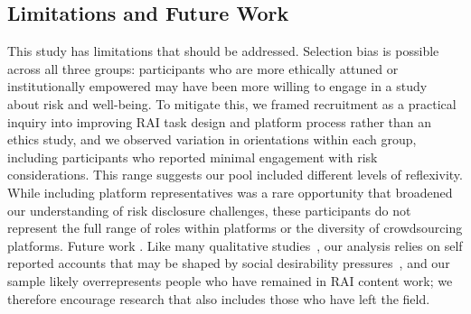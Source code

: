 \subsection{Limitations and Future Work}
This study has limitations that should be addressed. Selection bias is possible across all three groups: participants who are more ethically attuned or institutionally empowered may have been more willing to engage in a study about risk and well-being. To mitigate this, we framed recruitment as a practical inquiry into improving RAI task design and platform process rather than an ethics study, and we observed variation in orientations within each group, including participants who reported minimal engagement with risk considerations. This range suggests our pool included different levels of reflexivity. While including platform representatives was a rare opportunity that broadened our understanding of risk disclosure challenges, these participants do not represent the full range of roles within platforms or the diversity of crowdsourcing platforms. Future work . Like many qualitative studies~\cite{tang2024ai}, our analysis relies on self reported accounts that may be shaped by social desirability pressures~\cite{bergen2020everything}, and our sample likely overrepresents people who have remained in RAI content work; we therefore encourage research that also includes those who have left the field.